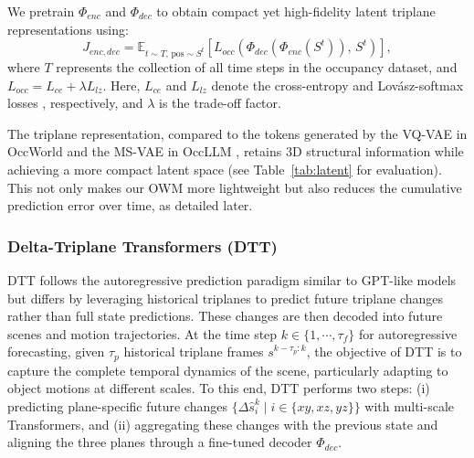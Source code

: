 \documentclass[11pt,a4paper]{article}
\begin{document}
We pretrain $\Phi_{enc}$ and $\Phi_{dec}$ to obtain compact yet high-fidelity latent triplane representations using:
\begin{equation}
  J_{enc,dec} = \mathbb{E}_{t \sim T,\, \text{pos} \sim S^t}\left[ L_{occ}\!\left(\Phi_{dec}(\Phi_{enc}(S^t)),\, S^t\right) \right],
  \label{eq:pretrain}
\end{equation}
where $T$ represents the collection of all time steps in the occupancy dataset, and $L_{occ} = L_{ce} + \lambda L_{lz}$.
Here, $L_{ce}$ and $L_{lz}$ denote the cross-entropy and Lovász-softmax losses \cite{maximberman2018,juminlee2024}, respectively, and $\lambda$ is the trade-off factor.

The triplane representation, compared to the tokens generated by the VQ-VAE in OccWorld \cite{wenzhaozheng2024} and the MS-VAE in OccLLM \cite{tianshuoxu2025}, retains 3D structural information while achieving a more compact latent space (see Table~\ref{tab:latent} for evaluation).
This not only makes our OWM more lightweight but also reduces the cumulative prediction error over time, as detailed later.

\subsubsection{Delta-Triplane Transformers (DTT)}

DTT follows the autoregressive prediction paradigm similar to GPT-like models but differs by leveraging historical triplanes to predict future triplane changes rather than full state predictions.
These changes are then decoded into future scenes and motion trajectories.
At the time step $k \in \{1, \cdots, \tau_f\}$ for autoregressive forecasting, given $\tau_p$ historical triplane frames $s^{k-\tau_p:k}$, the objective of DTT is to capture the complete temporal dynamics of the scene, particularly adapting to object motions at different scales.
To this end, DTT performs two steps: (i) predicting plane-specific future changes $\{\Delta\hat{s}^k_i \mid i \in \{xy, xz, yz\}\}$ with multi-scale Transformers, and (ii) aggregating these changes with the previous state and aligning the three planes through a fine-tuned decoder $\Phi_{dec}$.
\end{document}
